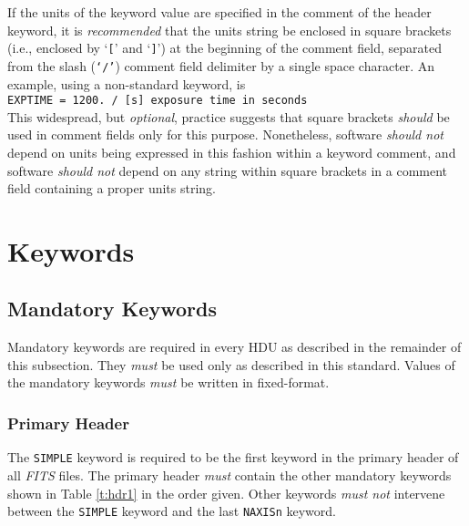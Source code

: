 \documentclass[11pt,makeidx]{book}     %
\begin{document}
If the units of the keyword value are specified in the comment of the
header keyword, it is {\em recommended} that the units string be
enclosed in square brackets (i.e., enclosed by `{\tt [}' and `{\tt ]}') at the 
beginning of the comment field,
separated from the slash ({\tt `/'}) comment field delimiter by a
single space character.  An example, using a non-standard keyword, is\\
{\tt EXPTIME =                1200. / [s] exposure time in seconds} \\
This widespread, but {\em optional}, practice 
suggests that square brackets {\em should} be used in comment fields only
for this purpose.  Nonetheless, software {\em should not} depend on
units being expressed in this fashion within a keyword comment, and software
{\em should not} depend on any string within square brackets in a
comment field containing a proper units string. 
 



  \section{Keywords}
   \label{s:key}
                                   
   \subsection{Mandatory Keywords}
   Mandatory keywords are required in every HDU as 
   described in the remainder of this subsection. They {\em must} be used only as
   described in this standard. \label{s:man}
   Values of the mandatory keywords {\em must} be written in fixed-format.

   \subsubsection{Primary Header}
   \label{s:keyprime}
   The {\tt SIMPLE} keyword is
   required to be the first keyword in the primary
   header of all {\em FITS\/} files.  
   The primary header {\em must} contain the other mandatory keywords 
   shown in Table \ref{t:hdr1} in the 
   order
   given. \label{s:pman} Other keywords {\em must not} intervene between
   the {\tt SIMPLE} keyword and the last {\tt NAXISn} keyword.
                                                
\end{document}

